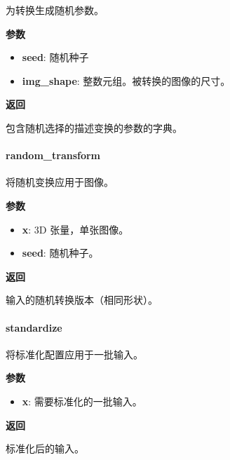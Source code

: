 \begin{Shaded}
\begin{Highlighting}[]
\OperatorTok{=}\NormalTok{)}
\end{Highlighting}
\end{Shaded}

为转换生成随机参数。

\textbf{参数}

\begin{itemize}
\tightlist
\item
  \textbf{seed}: 随机种子
\item
  \textbf{img\_shape}: 整数元组。被转换的图像的尺寸。
\end{itemize}

\textbf{返回}

包含随机选择的描述变换的参数的字典。


\hypertarget{random_transform}{%
\paragraph{random\_transform}\label{random_transform}}

\begin{Shaded}
\begin{Highlighting}[]
\OperatorTok{=}\NormalTok{)}
\end{Highlighting}
\end{Shaded}

将随机变换应用于图像。

\textbf{参数}

\begin{itemize}
\tightlist
\item
  \textbf{x}: 3D 张量，单张图像。
\item
  \textbf{seed}: 随机种子。
\end{itemize}

\textbf{返回}

输入的随机转换版本（相同形状）。


\hypertarget{standardize}{%
\paragraph{standardize}\label{standardize}}

\begin{Shaded}
\begin{Highlighting}[]
\end{Highlighting}
\end{Shaded}

将标准化配置应用于一批输入。

\textbf{参数}

\begin{itemize}
\tightlist
\item
  \textbf{x}: 需要标准化的一批输入。
\end{itemize}

\textbf{返回}

标准化后的输入。



\newpage
